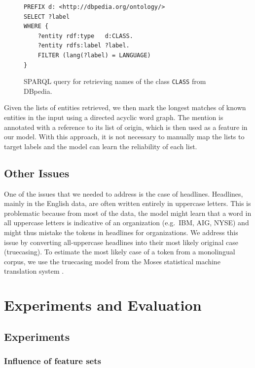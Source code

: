\documentclass[11pt]{article}
\begin{document}
\begin{figure}
\begin{verbatim}
PREFIX d: <http://dbpedia.org/ontology/>
SELECT ?label
WHERE {
    ?entity rdf:type   d:CLASS.
    ?entity rdfs:label ?label.
    FILTER (lang(?label) = LANGUAGE)
}
\end{verbatim}
\caption{SPARQL query for retrieving names of the class \texttt{CLASS} from DBpedia.}
\label{fig:sparql}

\end{figure}

Given the lists of entities retrieved, we then mark the longest matches of known entities in the input using a directed acyclic word graph. 
The mention is annotated with a reference to its list of origin, which is then used as a feature in our model. With this approach, it is not 
necessary to manually map the lists to target labels and the model can learn the reliability of each list.


\subsection{Other Issues}

One of the issues that we needed to address is the case of headlines. Headlines, mainly in the English data, are often written entirely 
in uppercase letters. This is problematic because from most of the data, the model might learn that a word in all uppercase letters is 
indicative of an organization (e.g.\ IBM, AIG, NYSE) and might thus mistake the tokens in headlines for organizations. 
We address this issue by converting all-uppercase headlines into their most likely original case (truecasing). 
To estimate the most likely case of a token from a monolingual corpus, we use the truecasing model from the 
Moses statistical machine translation system \cite{koehn2007moses}. 





\section{Experiments and Evaluation}

\subsection{Experiments}

\subsubsection{Influence of feature sets}
\end{document}
